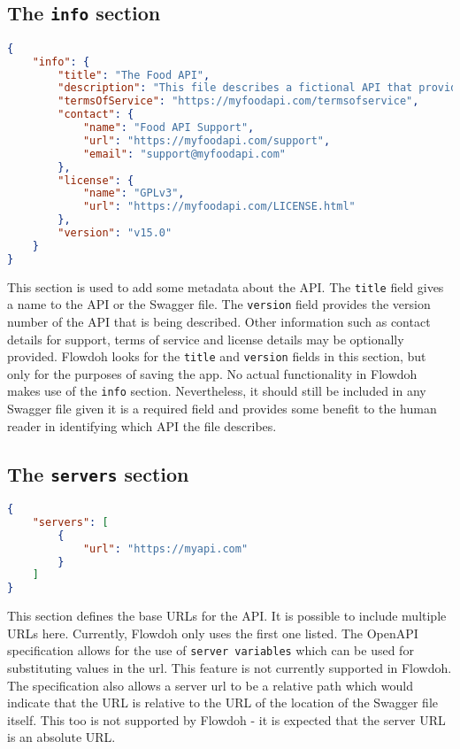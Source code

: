 \subsection{The \texttt{info} section}
\begin{lstlisting}[caption={A fully populated \texttt{info} section},label={code:info_section},language=json]
{
    "info": {
        "title": "The Food API",
        "description": "This file describes a fictional API that provides details about food items",
        "termsOfService": "https://myfoodapi.com/termsofservice",
        "contact": {
            "name": "Food API Support",
            "url": "https://myfoodapi.com/support",
            "email": "support@myfoodapi.com"
        },
        "license": {
            "name": "GPLv3",
            "url": "https://myfoodapi.com/LICENSE.html"
        },
        "version": "v15.0"
    }
}
\end{lstlisting}
This section is used to add some metadata about the API. The \texttt{title} field gives a name to the API or the Swagger file. The \texttt{version} field provides the version number of the API that is being described. Other information such as contact details for support, terms of service and license details may be optionally provided. Flowdoh looks for the \texttt{title} and \texttt{version} fields in this section, but only for the purposes of saving the app. No actual functionality in Flowdoh makes use of the \texttt{info} section. Nevertheless, it should still be included in any Swagger file given it is a required field and provides some benefit to the human reader in identifying which API the file describes.
\subsection{The \texttt{servers} section}

\begin{lstlisting}[caption={A URL defined in the \texttt{servers} section},label={code:servers},language=json]
{
    "servers": [
        {
            "url": "https://myapi.com"
        }
    ]
}
\end{lstlisting}
This section defines the base URLs for the API. It is possible to include multiple URLs here. Currently, Flowdoh only uses the first one listed. The OpenAPI specification allows for the use of \texttt{server variables} which can be used for substituting values in the url. This feature is not currently supported in Flowdoh. The specification also allows a server url to be a relative path which would indicate that the URL is relative to the URL of the location of the Swagger file itself. This too is not supported by Flowdoh - it is expected that the server URL is an absolute URL.

